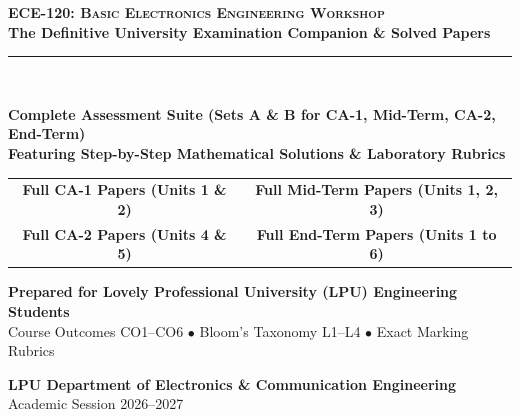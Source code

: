 \begin{titlepage}
\pagecolor{LPUNavy}
\color{white}
\vspace*{1.5cm}

\begin{center}
    {\Huge \bfseries \scshape ECE-120: Basic Electronics Engineering Workshop}\\[5mm]
    {\LARGE \bfseries The Definitive University Examination Companion \& Solved Papers}\\[8mm]
    {\color{LPUOrange}\rule{0.8\textwidth}{2pt}}\\[10mm]

    \begin{tcolorbox}[enhanced, width=0.88\textwidth, colback=white, colframe=LPUOrange, boxrule=1.5pt, arc=3mm, halign=center]
        \color{DarkSlate}
        \vspace{2mm}
        {\Large\bfseries Complete Assessment Suite (Sets A \& B for CA-1, Mid-Term, CA-2, End-Term)}\\[3mm]
        {\large\bfseries Featuring Step-by-Step Mathematical Solutions \& Laboratory Rubrics}\\[3mm]
        \begin{tabular}{cc}
            \color{LPUNavy}\textbf{Full CA-1 Papers (Units 1 \& 2)} & \quad \color{LPUNavy}\textbf{Full Mid-Term Papers (Units 1, 2, 3)} \\
            \color{LPUNavy}\textbf{Full CA-2 Papers (Units 4 \& 5)} & \quad \color{LPUNavy}\textbf{Full End-Term Papers (Units 1 to 6)} \\
        \end{tabular}
        \vspace{2mm}
    \end{tcolorbox}

    \vfill

    {\large \bfseries Prepared for Lovely Professional University (LPU) Engineering Students}\\[2mm]
    {\small Course Outcomes CO1--CO6 $\bullet$ Bloom's Taxonomy L1--L4 $\bullet$ Exact Marking Rubrics}\\[10mm]

    \begin{tcolorbox}[width=0.6\textwidth, colback=LPUNavy!80!black, colframe=white, boxrule=0.5pt, halign=center]
        \color{white}
        \textbf{LPU Department of Electronics \& Communication Engineering}\\[1mm]
        {\footnotesize Academic Session 2026--2027}
    \end{tcolorbox}
    \vspace*{1cm}
\end{center}
\end{titlepage}
\nopagecolor
\newpage
